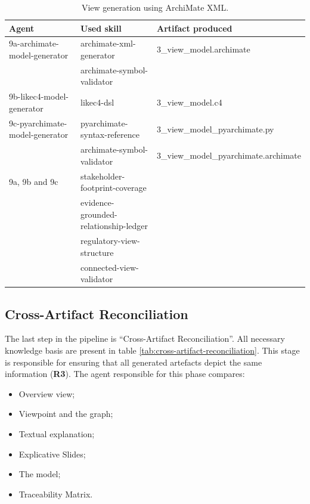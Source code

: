 \begin{table}[h]
\centering
\small
\begin{tabular}{p{5.2cm} p{5.5cm} p{3.5cm}}
\hline
\textbf{Agent} & \textbf{Used skill} & \textbf{Artifact produced} \\
\hline
9a-archimate-model-generator & archimate-xml-generator & 3\_view\_model.archimate \\
 & archimate-symbol-validator &  \\
\hline
9b-likec4-model-generator & likec4-dsl & 3\_view\_model.c4 \\
\hline
9c-pyarchimate-model-generator & pyarchimate-syntax-reference & 3\_view\_model\_pyarchimate.py\\
 & archimate-symbol-validator & 3\_view\_model\_pyarchimate.archimate \\
\hline
9a, 9b and 9c & stakeholder-footprint-coverage &  \\
 & evidence-grounded-relationship-ledger &  \\
 & regulatory-view-structure &  \\
 & connected-view-validator &  \\
\hline
\end{tabular}
\caption{View generation using ArchiMate XML.}
\label{tab:view-generation-archimate}
\end{table}


\subsection{Cross-Artifact Reconciliation}

The last step in the pipeline is ``Cross-Artifact Reconciliation''.  All necessary knowledge basis are present in table \ref{tab:cross-artifact-reconciliation}. This stage is responsible for ensuring that all generated artefacts depict the same information (\textbf{R3}). The agent responsible for this phase compares:
\begin{itemize}
    \item Overview view;
    \item Viewpoint and the graph;
    \item Textual explanation;
    \item Explicative Slides; 
    \item The model;
    \item Traceability Matrix.
\end{itemize}

